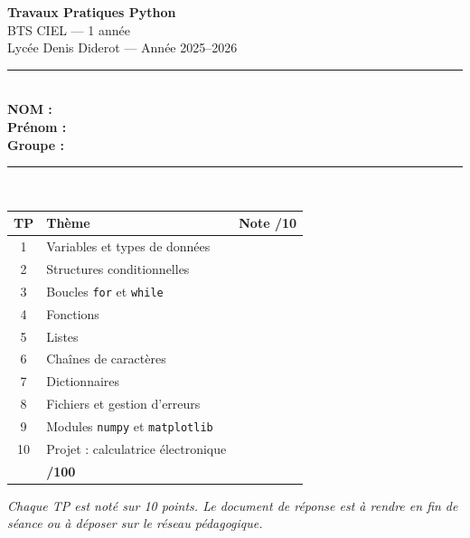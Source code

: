 \documentclass[11pt,a4paper]{article}
\begin{document}

\thispagestyle{empty}
\begin{center}
  \vspace*{2cm}
  {\Huge\bfseries Travaux Pratiques Python}\\[0.5cm]
  {\Large BTS CIEL --- 1\iere{} année}\\[0.3cm]
  {\large Lycée Denis Diderot \quad --- \quad Année 2025--2026}\\[2cm]
  \rule{12cm}{1pt}\\[0.6cm]
  {\large\bfseries NOM : \underline{\hspace{6cm}}}\\[0.6cm]
  {\large\bfseries Prénom : \underline{\hspace{5.5cm}}}\\[0.6cm]
  {\large\bfseries Groupe : \underline{\hspace{5.6cm}}}\\[1cm]
  \rule{12cm}{1pt}\\[1.5cm]
  \begin{tabular}{|c|l|c|}
    \hline
    \rowcolor{NavyBlue!20}
    \textbf{TP} & \textbf{Thème} & \textbf{Note /10} \\
    \hline
    1  & Variables et types de données          & \hspace{1.5cm} \\
    \hline
    2  & Structures conditionnelles             & \\
    \hline
    3  & Boucles \texttt{for} et \texttt{while} & \\
    \hline
    4  & Fonctions                              & \\
    \hline
    5  & Listes                                 & \\
    \hline
    6  & Chaînes de caractères                  & \\
    \hline
    7  & Dictionnaires                          & \\
    \hline
    8  & Fichiers et gestion d'erreurs          & \\
    \hline
    9  & Modules \texttt{numpy} et \texttt{matplotlib} & \\
    \hline
    10 & Projet : calculatrice électronique     & \\
    \hline
    \rowcolor{gray!15}
    \multicolumn{2}{|r|}{\textbf{Total}} & \textbf{/100} \\
    \hline
  \end{tabular}
\end{center}
\vfill
{\footnotesize\textit{Chaque TP est noté sur 10 points. Le document de réponse est à rendre en fin de séance ou à déposer sur le réseau pédagogique.}}
\end{document}
